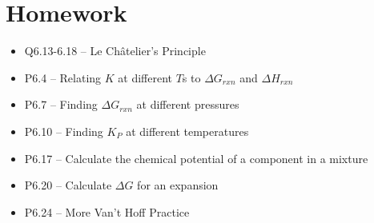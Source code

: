 \documentclass[12pt, openany, letterpaper]{memoir}
\begin{document}
\section*{Homework}
\begin{itemize}
	\item Q6.13-6.18 -- Le Ch\^atelier's Principle
	\item P6.4 -- Relating $K$ at different $T$s to $\Delta G_{rxn}$ and $\Delta H_{rxn}$
	\item P6.7 -- Finding $\Delta G_{rxn}$ at different pressures
	\item P6.10 -- Finding $K_P$ at different temperatures
	\item P6.17 -- Calculate the chemical potential of a component in a mixture
	\item P6.20 -- Calculate $\Delta G$ for an expansion
	\item P6.24 -- More Van't Hoff Practice
\end{itemize}
\end{document}
